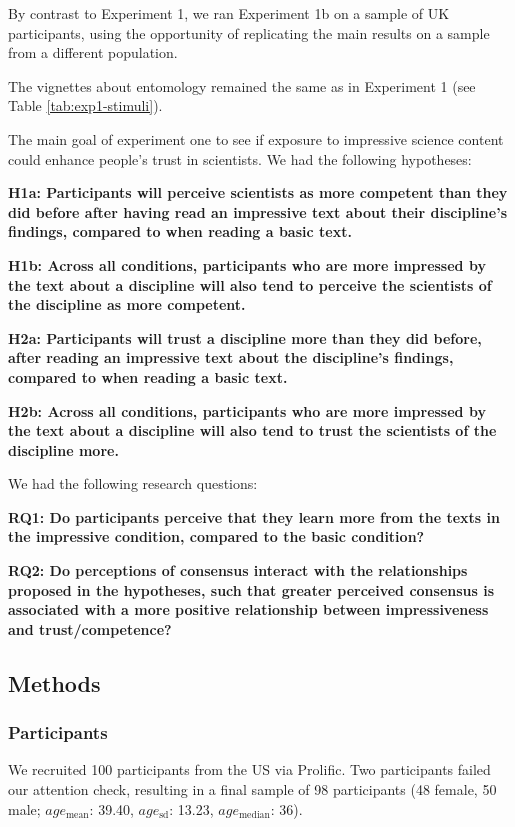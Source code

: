 \documentclass[
  english,
  doc,floatsintext]{apa6}
\begin{document}
By contrast to Experiment 1, we ran Experiment 1b on a sample of UK participants, using the opportunity of replicating the main results on a sample from a different population.

The vignettes about entomology remained the same as in Experiment 1 (see Table \ref{tab:exp1-stimuli}).

The main goal of experiment one to see if exposure to impressive science content could enhance people's trust in scientists. We had the following hypotheses:

\textbf{H1a: Participants will perceive scientists as more competent than they did before after having read an impressive text about their discipline's findings, compared to when reading a basic text.}

\textbf{H1b: Across all conditions, participants who are more impressed by the text about a discipline will also tend to perceive the scientists of the discipline as more competent.}

\textbf{H2a: Participants will trust a discipline more than they did before, after reading an impressive text about the discipline's findings, compared to when reading a basic text.}

\textbf{H2b: Across all conditions, participants who are more impressed by the text about a discipline will also tend to trust the scientists of the discipline more.}

We had the following research questions:

\textbf{RQ1: Do participants perceive that they learn more from the texts in the impressive condition, compared to the basic condition?}

\textbf{RQ2: Do perceptions of consensus interact with the relationships proposed in the hypotheses, such that greater perceived consensus is associated with a more positive relationship between impressiveness and trust/competence?}

\subsection{Methods}\label{methods-2}

\subsubsection{Participants}\label{participants-2}

We recruited 100 participants from the US via Prolific. Two participants failed our attention check, resulting in a final sample of 98 participants (48 female, 50 male; \(age_\text{mean}\): 39.40, \(age_\text{sd}\): 13.23, \(age_\text{median}\): 36).
\end{document}
